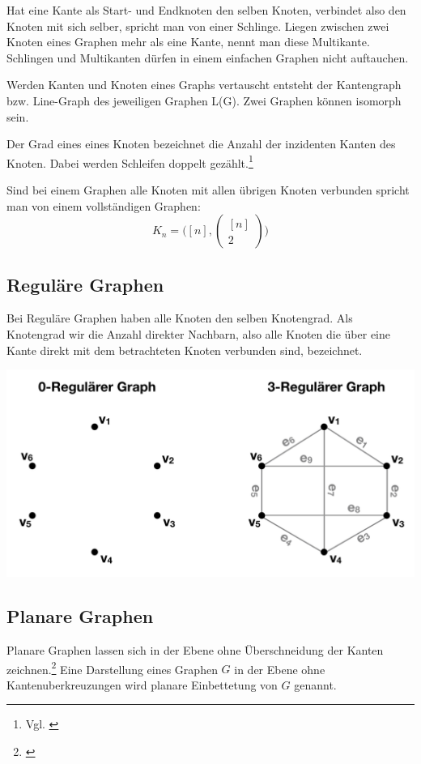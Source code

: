 Hat eine Kante als Start- und Endknoten den selben Knoten, verbindet also den Knoten mit sich selber, spricht man von einer Schlinge.
Liegen zwischen zwei Knoten eines Graphen mehr als eine Kante, nennt man diese Multikante.
Schlingen und Multikanten dürfen in einem einfachen Graphen nicht auftauchen.\cite{felsner01}

Werden Kanten und Knoten eines Graphs vertauscht entsteht der Kantengraph bzw. Line-Graph des jeweiligen Graphen L(G).
Zwei Graphen können isomorph sein.

Der Grad eines eines Knoten bezeichnet die Anzahl der inzidenten Kanten des Knoten. Dabei werden Schleifen doppelt gezählt.\footnote{Vgl. \cite[Seite 13]{rahm2017}}

Sind bei einem Graphen alle Knoten mit allen übrigen Knoten verbunden spricht man von einem vollständigen Graphen:
	\[K_{n}=\big([n],\begin{pmatrix}
		[n] \\ 2
	\end{pmatrix}\big)\]

\subsection{Reguläre Graphen}
Bei Reguläre Graphen haben alle Knoten den selben Knotengrad.
Als Knotengrad wir die Anzahl direkter Nachbarn, also alle Knoten die über eine Kante direkt mit dem betrachteten Knoten verbunden sind, bezeichnet.\cite{felsner2012geometric}
\begin{center}
	\includegraphics[scale = 0.5]{./images/Regulaerer_graph.png}
\end{center}
\subsection{Planare Graphen}
Planare Graphen lassen sich in der Ebene ohne Überschneidung der Kanten zeichnen.\footnote{\cite{Theobald2016}}  Eine Darstellung eines Graphen $G$ in der Ebene ohne Kantenuberkreuzungen wird planare Einbettetung von $G$ genannt.


